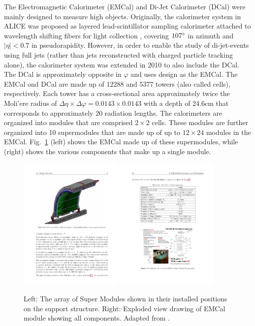 The Electromagnetic Calorimeter (EMCal) and Di-Jet Calorimeter (DCal) were mainly designed to measure high \pt objects. Originally, the calorimeter system in ALICE was proposed as layered lead-scintillator sampling calorimeter attached to wavelength shifting fibers for light collection \cite{Blau2020}, covering $107\degree$ in azimuth and  $|\eta| < 0.7$ in pseudorapidity. However, in order to enable the study of di-jet-events using full jets (rather than jets reconstructed with charged particle tracking alone), the calorimeter system was extended in 2010 to also include the DCal. The DCal is approximately opposite in $\varphi$ and uses design as the EMCal. The EMCal ond DCal are made up of 12288 and 5377 towers (also called cells), respectively. Each tower has a cross-sectional area approximately twice the Moli'ere radius of $\Delta\eta\times\Delta\varphi = 0.0143\times0.0143$ with a depth of 24.6cm that corresponds to approximately 20 radiation lengths. The calorimeters are organized into modules that are comprised $2\times2$ cells. These modules are further organized into 10 supermodules that are made up of up to $12\times24$ modules in the EMCal. Fig.~\ref{fig:emcal} (left) shows the EMCal made up of these supermodules, while (right) shows the various components that make up a single module.

\begin{figure}[htpb]
  \centering
  \includegraphics[width=0.45\textwidth]{Experimental_Aparatus/emcal.pdf}
  \includegraphics[width=0.45\textwidth]{Experimental_Aparatus/module.pdf}
  \caption{Left: The array of Super Modules shown in their installed positions on the support structure. Right: Exploded view drawing of EMCal module showing all components. Adapted from \cite{Bellwied2010}.}
  \label{fig:emcal}
\end{figure}


